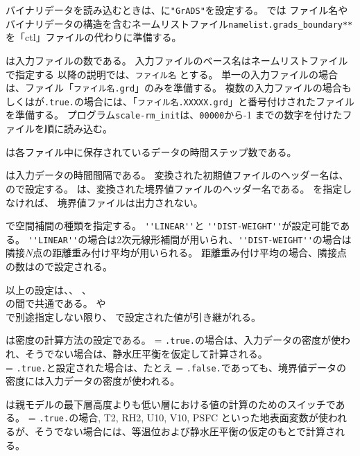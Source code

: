 バイナリデータを読み込むときは、に\verb|"GrADS"|を設定する。
\scalerm では ファイル名やバイナリデータの構造を含むネームリストファイル\verb|namelist.grads_boundary**|を「ctl」ファイルの代わりに準備する。

は入力ファイルの数である。
入力ファイルのベース名はネームリストファイルで指定する
以降の説明では、\verb|ファイル名| とする。
単一の入力ファイルの場合は、ファイル「\verb|ファイル名.grd|」のみを準備する。
複数の入力ファイルの場合もしくはが\verb|.true.|の場合には、「\verb|ファイル名.XXXXX.grd|」と番号付けされたファイルを準備する。
プログラム\verb|scale-rm_init|は、\verb|00000|から-1 までの数字を付けたファイルを順に読み込む。

は各ファイル中に保存されているデータの時間ステップ数である。

は入力データの時間間隔である。
変換された初期値ファイルのヘッダー名は、ので設定する。
は、変換された境界値ファイルのヘッダー名である。
を指定しなければ、 境界値ファイルは出力されない。

で空間補間の種類を指定する。
\verb|''LINEAR''|と \verb|''DIST-WEIGHT''|が設定可能である。
\verb|''LINEAR''|の場合は2次元線形補間が用いられ、\verb|''DIST-WEIGHT''|の場合は隣接$N$点の距離重み付け平均が用いられる。
距離重み付け平均の場合、隣接点の数はので設定される。

以上の設定は、、
、\\
の間で共通である。
や \\
で別途指定しない限り、
で設定された値が引き継がれる。
%

は密度の計算方法の設定である。
 = \verb|.true.|の場合は、入力データの密度が使われ、そうでない場合は、静水圧平衡を仮定して計算される。\\
 = \verb|.true.|と設定された場合は、たとえ = \verb|.false.|であっても、境界値データの密度には入力データの密度が使われる。

は親モデルの最下層高度よりも低い層における値の計算のためのスイッチである。
 = \verb|.true.|の場合, T2, RH2, U10, V10, PSFC といった地表面変数が使われるが、そうでない場合には、等温位および静水圧平衡の仮定のもとで計算される。

